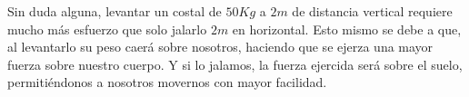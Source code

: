 \documentclass[10pt, a4paper]{article}
\begin{document}
\begin{enumerate}
\begin{enumerate}
            \begin{center}
                Sin duda alguna, levantar un costal de $50\si{Kg}$ a $2\si{m}$ de distancia vertical requiere
                mucho más esfuerzo que solo jalarlo $2\si{m}$ en horizontal. Esto mismo se debe a que, al levantarlo
                su peso caerá sobre nosotros, haciendo que se ejerza una mayor fuerza sobre nuestro cuerpo. Y si lo jalamos,
                la fuerza ejercida será sobre el suelo, permitiéndonos a nosotros movernos con mayor facilidad. 
            \end{center}

        \end{enumerate}
    \end{enumerate}
\end{document}
